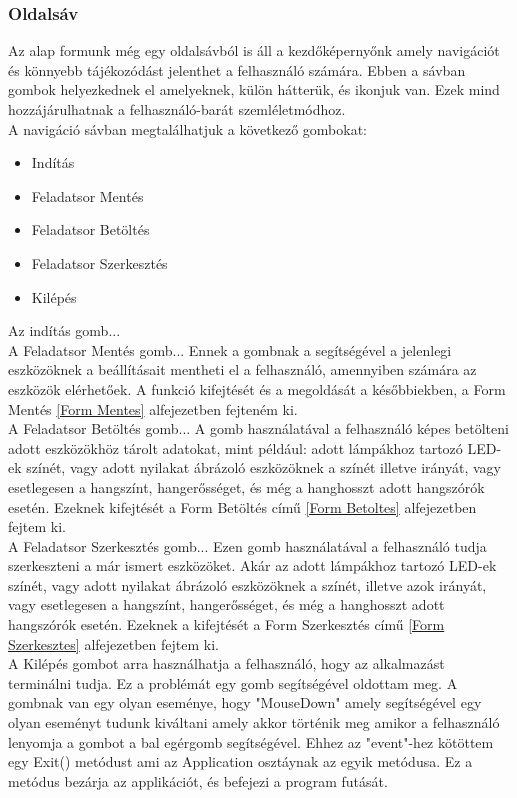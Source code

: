 \documentclass[tocnopagenum]{thesis-ekf}
\theoremstyle{definition}
\theoremstyle{remark}
\begin{document}
	\subsubsection{Oldalsáv}
	Az alap formunk még egy oldalsávból is áll a kezdőképernyőnk amely navigációt és könnyebb tájékozódást jelenthet a felhasználó számára.
	Ebben a sávban gombok helyezkednek el amelyeknek, külön hátterük, és ikonjuk van. Ezek mind hozzájárulhatnak a felhasználó-barát szemléletmódhoz.
	\\
	A navigáció sávban megtalálhatjuk a következő gombokat:
	\begin{itemize}
		\item Indítás
		\item Feladatsor Mentés
		\item Feladatsor Betöltés
		\item Feladatsor Szerkesztés
		\item Kilépés
	\end{itemize}
	Az indítás gomb...
	\\
	A Feladatsor Mentés gomb...
	Ennek a gombnak a segítségével a jelenlegi eszközöknek a beállításait mentheti el a felhasználó, amennyiben számára az eszközök elérhetőek. A funkció kifejtését és a megoldását a későbbiekben, a Form Mentés \ref{Form Mentes} alfejezetben fejteném ki.
	\\
	A Feladatsor Betöltés gomb...
	A gomb használatával a felhasználó képes betölteni adott eszközökhöz tárolt adatokat, mint például: adott lámpákhoz tartozó LED-ek színét, vagy adott nyilakat ábrázoló eszközöknek a színét illetve irányát, vagy esetlegesen a hangszínt, hangerősséget, és még a hanghosszt adott hangszórók esetén.
	Ezeknek kifejtését a Form Betöltés című \ref{Form Betoltes}
	alfejezetben fejtem ki.
	\\
	A Feladatsor Szerkesztés gomb...
	Ezen gomb használatával a felhasználó tudja szerkeszteni a már ismert eszközöket. Akár az adott lámpákhoz tartozó LED-ek színét, vagy adott nyilakat ábrázoló eszközöknek a színét, illetve azok irányát, vagy esetlegesen a hangszínt, hangerősséget, és még a hanghosszt adott hangszórók esetén.
	Ezeknek a kifejtését a Form Szerkesztés című \ref{Form Szerkesztes}	alfejezetben fejtem ki.
	\\
	A Kilépés gombot arra használhatja a felhasználó, hogy az alkalmazást terminálni tudja. Ez a problémát egy gomb segítségével oldottam meg. A gombnak van egy olyan eseménye, hogy "MouseDown" amely segítségével egy olyan eseményt tudunk kiváltani amely akkor történik meg amikor a felhasználó lenyomja a gombot a bal egérgomb segítségével.
	Ehhez az "event"-hez kötöttem egy Exit() metódust ami az Application osztáynak az egyik metódusa. Ez a metódus bezárja az applikációt, és befejezi a program futását. 
\end{document}

